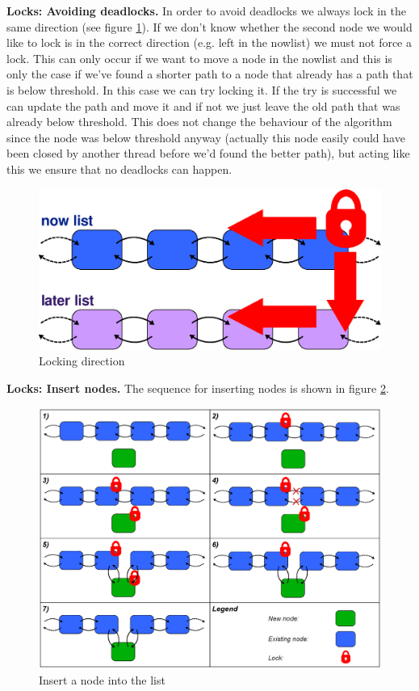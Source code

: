 \documentclass[letterpaper]{article}
\newcommand{\mypar}[1]{{\bf #1.}}
\begin{document}
\mypar{Locks: Avoiding deadlocks}
In order to avoid deadlocks we always lock in the same direction (see figure \ref{fig:lock}). If we don't know whether the second node we would like to lock is in the correct direction (e.g. left in the nowlist) we must not force a lock. This can only occur if we want to move a node in the nowlist and this is only the case if we've found a shorter path to a node that already has a path that is below threshold. In this case we can try locking it. If the try is successful we can update the path and move it and if not we just leave the old path that was already below threshold. This does not change the behaviour of the algorithm since the node was below threshold anyway (actually this node easily could have been closed by another thread before we'd found the better path), but acting like this we ensure that no deadlocks can happen.

\begin{figure}[h]\centering
  \includegraphics[scale=0.38]{locking.eps}
  \caption{Locking direction \label{fig:lock}}
\end{figure}

\mypar{Locks: Insert nodes}
The sequence for inserting nodes is shown in figure \ref{fig:insert}.

\begin{figure}[h]\centering
  \includegraphics[scale=0.31]{insert.eps}
  \caption{Insert a node into the list \label{fig:insert}}
\end{figure}
\end{document}
